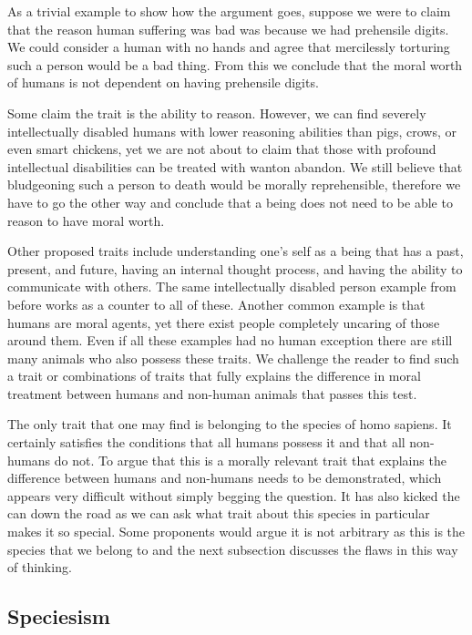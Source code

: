 As a trivial example to show how the argument goes, suppose we were to claim that the reason human suffering was bad was because we had prehensile digits. We could consider a human with no hands and agree that mercilessly torturing such a person would be a bad thing. From this we conclude that the moral worth of humans is not dependent on having prehensile digits.

Some claim the trait is the ability to reason. However, we can find severely intellectually disabled humans with lower reasoning abilities than pigs, crows, or even smart chickens, yet we are not about to claim that those with profound intellectual disabilities can be treated with wanton abandon. We still believe that bludgeoning such a person to death would be morally reprehensible, therefore we have to go the other way and conclude that a being does not need to be able to reason to have moral worth.

Other proposed traits include understanding one's self as a being that has a past, present, and future, having an internal thought process, and having the ability to communicate with others. The same intellectually disabled person example from before works as a counter to all of these. Another common example is that humans are moral agents, yet there exist people completely uncaring of those around them. Even if all these examples had no human exception there are still many animals who also possess these traits. We challenge the reader to find such a trait or combinations of traits that fully explains the difference in moral treatment between humans and non-human animals that passes this test.

The only trait that one may find is belonging to the species of homo sapiens. It certainly satisfies the conditions that all humans possess it and that all non-humans do not. To argue that this is a morally relevant trait that explains the difference between humans and non-humans needs to be demonstrated, which appears very difficult without simply begging the question. It has also kicked the can down the road as we can ask what trait about this species in particular makes it so special. Some proponents would argue it is not arbitrary as this is the species that we belong to and the next subsection discusses the flaws in this way of thinking.

\subsection{Speciesism}

